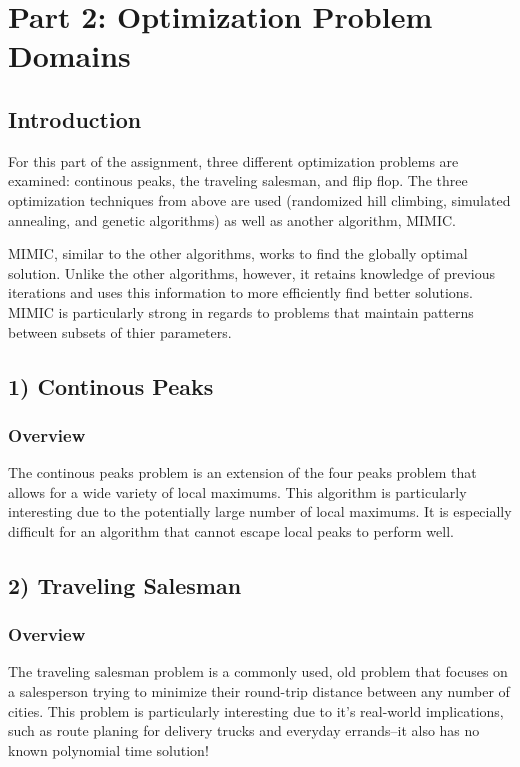 \documentclass[h]{article}
\begin{document}
\section*{Part 2: Optimization Problem Domains}
\subsection*{ Introduction}  
For this part of the assignment, three different optimization problems are 
examined: continous peaks, the traveling salesman, and flip flop.  The three
optimization techniques from above are used (randomized hill climbing, simulated annealing, and genetic algorithms) 
as well as another algorithm, MIMIC.

MIMIC, similar to the other algorithms, works to find the globally optimal 
solution.  Unlike the other algorithms, however, it retains knowledge of previous 
iterations and uses this information to more efficiently find better solutions.  MIMIC is particularly strong in regards to 
problems that maintain patterns between subsets of thier parameters.

\subsection*{1) Continous Peaks}  
\subsubsection*{Overview}
The continous peaks problem is an extension of the four peaks problem that 
allows for a wide variety of local maximums.  This algorithm is particularly interesting due to the potentially large 
number of local maximums.  It is especially difficult for an algorithm that cannot escape 
local peaks to perform well.

\subsection*{2) Traveling Salesman}  
\subsubsection*{Overview}
The traveling salesman problem is a commonly used, old problem that focuses on a 
salesperson trying to minimize their round-trip distance between any number of cities.  This problem is particularly 
interesting  due to it's real-world implications, such as route planing for 
delivery trucks and everyday errands--it also has no known polynomial time 
solution!
\end{document}
